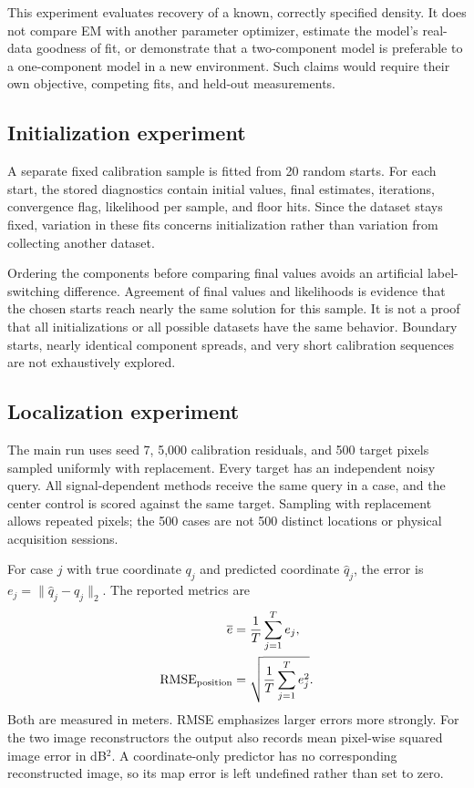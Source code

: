 \documentclass[conference,letterpaper]{IEEEtran}
\begin{document}
This experiment evaluates recovery of a known, correctly specified density. It does not compare EM with another parameter optimizer, estimate the model's real-data goodness of fit, or demonstrate that a two-component model is preferable to a one-component model in a new environment. Such claims would require their own objective, competing fits, and held-out measurements.

\subsection{Initialization experiment}
A separate fixed calibration sample is fitted from 20 random starts. For each start, the stored diagnostics contain initial values, final estimates, iterations, convergence flag, likelihood per sample, and floor hits. Since the dataset stays fixed, variation in these fits concerns initialization rather than variation from collecting another dataset.

Ordering the components before comparing final values avoids an artificial label-switching difference. Agreement of final values and likelihoods is evidence that the chosen starts reach nearly the same solution for this sample. It is not a proof that all initializations or all possible datasets have the same behavior. Boundary starts, nearly identical component spreads, and very short calibration sequences are not exhaustively explored.

\subsection{Localization experiment}
The main run uses seed 7, 5,000 calibration residuals, and 500 target pixels sampled uniformly with replacement. Every target has an independent noisy query. All signal-dependent methods receive the same query in a case, and the center control is scored against the same target. Sampling with replacement allows repeated pixels; the 500 cases are not 500 distinct locations or physical acquisition sessions.

For case $j$ with true coordinate $q_j$ and predicted coordinate $\widehat q_j$, the error is $e_j=\|\widehat q_j-q_j\|_2$. The reported metrics are
\begin{align}
\overline e&=\frac{1}{T}\sum_{j=1}^{T} e_j,\\
\operatorname{RMSE}_{\rm position}&=\sqrt{\frac{1}{T}\sum_{j=1}^{T}e_j^2}.
\end{align}
Both are measured in meters. RMSE emphasizes larger errors more strongly. For the two image reconstructors the output also records mean pixel-wise squared image error in dB$^2$. A coordinate-only predictor has no corresponding reconstructed image, so its map error is left undefined rather than set to zero.
\end{document}
